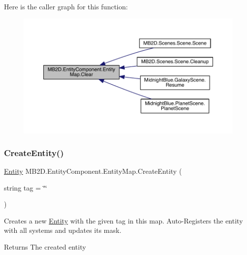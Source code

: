 Here is the caller graph for this function\+:\nopagebreak
\begin{figure}[H]
\begin{center}
\leavevmode
\includegraphics[width=350pt]{class_m_b2_d_1_1_entity_component_1_1_entity_map_a079e8e957e7fbaa8de73e609ab646fe1_icgraph}
\end{center}
\end{figure}
\hypertarget{class_m_b2_d_1_1_entity_component_1_1_entity_map_a2461bfeb368018daadb2578c445f8fc2}{}\label{class_m_b2_d_1_1_entity_component_1_1_entity_map_a2461bfeb368018daadb2578c445f8fc2} 
\subsubsection{\texorpdfstring{Create\+Entity()}{CreateEntity()}}
{\footnotesize\ttfamily \hyperlink{class_m_b2_d_1_1_entity_component_1_1_entity}{Entity} M\+B2\+D.\+Entity\+Component.\+Entity\+Map.\+Create\+Entity (\begin{DoxyParamCaption}\item[{string}]{tag = {\ttfamily \char`\"{}\char`\"{}} }\end{DoxyParamCaption})\hspace{0.3cm}{\ttfamily [inline]}}



Creates a new \hyperlink{class_m_b2_d_1_1_entity_component_1_1_entity}{Entity} with the given tag in this map. Auto-\/\+Registers the entity with all systems and updates its mask. 

\begin{DoxyReturn}{Returns}
The created entity
\end{DoxyReturn}

